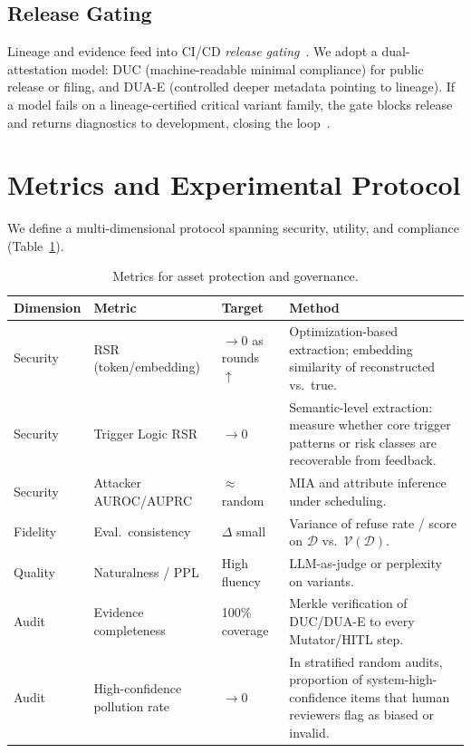 \documentclass[letterpaper,twocolumn,10pt]{article}
\begin{document}
\subsection{Release Gating}

Lineage and evidence feed into CI/CD \emph{release gating}~\cite{dual-use-attestations,owasp-spvs}. We adopt a dual-attestation model: DUC (machine-readable minimal compliance) for public release or filing, and DUA-E (controlled deeper metadata pointing to lineage). If a model fails on a lineage-certified critical variant family, the gate blocks release and returns diagnostics to development, closing the loop~\cite{ai-sre-cleric}.

\section{Metrics and Experimental Protocol}
\label{sec:metrics}

We define a multi-dimensional protocol spanning security, utility, and compliance (Table~\ref{tab:metrics}).

\begin{table}[t]
\centering
\caption{Metrics for asset protection and governance.}
\label{tab:metrics}
\small
\begin{tabular}{@{}llll@{}}
\toprule
\textbf{Dimension} & \textbf{Metric} & \textbf{Target} & \textbf{Method} \\
\midrule
Security & RSR (token/embedding) & $\rightarrow 0$ as rounds $\uparrow$ & Optimization-based extraction; embedding similarity of reconstructed vs.\ true. \\
Security & Trigger Logic RSR & $\rightarrow 0$ & Semantic-level extraction: measure whether core trigger patterns or risk classes are recoverable from feedback. \\
Security & Attacker AUROC/AUPRC & $\approx$ random & MIA and attribute inference under scheduling. \\
Fidelity & Eval.\ consistency & $\Delta$ small & Variance of refuse rate / score on $\mathcal{D}$ vs.\ $\mathcal{V}(\mathcal{D})$. \\
Quality & Naturalness / PPL & High fluency & LLM-as-judge or perplexity on variants. \\
Audit & Evidence completeness & 100\% coverage & Merkle verification of DUC/DUA-E to every Mutator/HITL step. \\
Audit & High-confidence pollution rate & $\rightarrow 0$ & In stratified random audits, proportion of system-high-confidence items that human reviewers flag as biased or invalid. \\
\bottomrule
\end{tabular}
\end{table}
\end{document}
